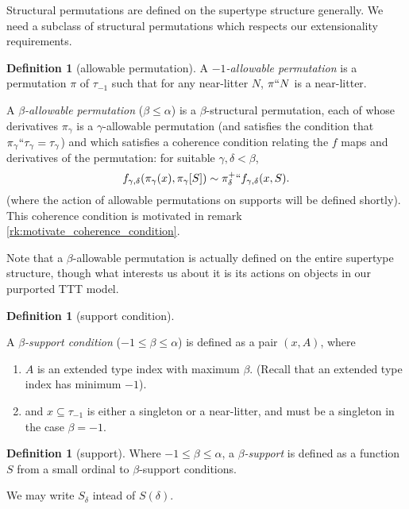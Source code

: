 \documentclass[112pt]{article}
\theoremstyle{definition}
\newtheorem{definition}[theorem]{Definition}
\theoremstyle{remark}
\begin{document}
Structural permutations are defined on the supertype structure generally.  We need a subclass of structural permutations which respects our extensionality requirements.

\begin{definition}[allowable permutation]\label{def:allowable_permutation}
A {\em $-1$-allowable permutation\/} is a permutation $\pi$ of $\tau_{-1}$ such that for any near-litter $N$, $\pi``N$ is a near-litter.

A {\em $\beta$-allowable permutation\/} ($\beta \leq \alpha$) is a $\beta$-structural permutation, each of whose derivatives $\pi_\gamma$ is a $\gamma$-allowable permutation (and satisfies the condition that $\pi_\gamma``\tau_\gamma = \tau_\gamma$) and which satisfies a coherence condition relating the $f$ maps and derivatives of the permutation:  for suitable $\gamma,\delta<\beta$, $$f_{\gamma,\delta}(\pi_\gamma(x),\pi_{\gamma}[S]) \sim \pi_\delta^+``f_{\gamma,\delta}(x,S).$$  (where the action of allowable
  permutations on supports will be defined shortly).
  {This coherence condition is motivated in remark \ref{rk:motivate_coherence_condition}.}
\end{definition}

Note that a $\beta$-allowable permutation is actually defined on the entire supertype structure, though what interests us about it is its actions on objects in our purported TTT model.

\begin{definition}[support condition]\label{def:support_condition}

A {\em $\beta$-support condition\/} ($-1 \leq \beta \leq \alpha$) is defined as a pair $(x,A)$, where
\begin{enumerate}

\item {$A$ is an extended type index with maximum $\beta$.  (Recall that an extended type index has minimum $-1$).}

\item

and $x\subseteq \tau_{-1}$ is either a singleton or a near-litter, and must be a singleton in the case $\beta=-1$.

\end{enumerate}
\end{definition}

\begin{definition}[support]\label{def:support}
Where $-1\leq\beta \leq \alpha$, a {\em $\beta$-support\/} is defined as a function $S$ from a small ordinal to $\beta$-support conditions.

We may write $S_\delta$ intead of $S(\delta)$.
\end{definition}
\end{document}
